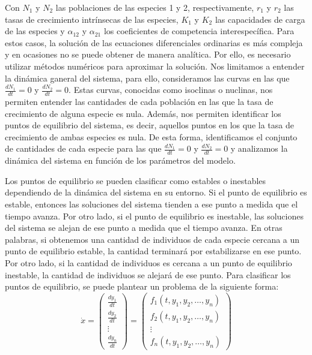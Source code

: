 \documentclass{article}
\begin{document}
Con \(N_1\) y \(N_2\) las poblaciones de las especies 1 y 2, respectivamente, \(r_1\) y \(r_2\) las tasas de crecimiento intrínsecas de las especies, \(K_1\) y \(K_2\) las capacidades de carga de las especies y \(\alpha_{12}\) y \(\alpha_{21}\) los coeficientes de competencia interespecífica.
Para estos casos, la solución de las ecuaciones diferenciales ordinarias es más compleja y en ocasiones no se puede obtener de manera analítica. Por ello, es necesario utilizar métodos numéricos para aproximar la solución.
Nos limitamos a entender la dinámica ganeral del sistema, para ello, consideramos las curvas en las que \(\frac{dN_1}{dt} = 0\) y \(\frac{dN_2}{dt} = 0\). Estas curvas, conocidas como isoclinas o nuclinas, nos permiten entender las cantidades de cada población en las que la tasa de crecimiento de alguna especie es nula. Además, nos permiten identificar los puntos de equilibrio del sistema, es decir, aquellos puntos en los que la tasa de crecimiento de ambas especies es nula.
De esta forma, identificamos el conjunto de cantidades de cada especie para las que $\frac{dN_1}{dt} = 0$ y $\frac{dN_2}{dt} = 0$ y analizamos la dinámica del sistema en función de los parámetros del modelo.

Los puntos de equilibrio se pueden clasificar como estables o inestables dependiendo de la dinámica del sistema en su entorno. Si el punto de equilibrio es estable, entonces las soluciones del sistema tienden a ese punto a medida que el tiempo avanza. Por otro lado, si el punto de equilibrio es inestable, las soluciones del sistema se alejan de ese punto a medida que el tiempo avanza.
En otras palabras, si obtenemos una cantidad de individuos de cada especie cercana a un punto de equilibrio estable, la cantidad terminará por estabilizarse en ese punto. Por otro lado, si la cantidad de individuos es cercana a un punto de equilibrio inestable, la cantidad de individuos se alejará de ese punto.
Para clasificar los puntos de equilibrio, se puede plantear un problema de la siguiente forma: 
\[
    \dot{x} =
\begin{pmatrix}
\frac{dy_1}{dt}\\
\frac{dy_2}{dt} \\
\vdots \\
\frac{dy_n}{dt}
\end{pmatrix}
=
\begin{pmatrix}
f_1(t, y_1, y_2, \ldots, y_n)\\
f_2(t, y_1, y_2, \ldots, y_n)\\
\vdots \\
f_n(t, y_1, y_2, \ldots, y_n)
\end{pmatrix}
\]
\end{document}
